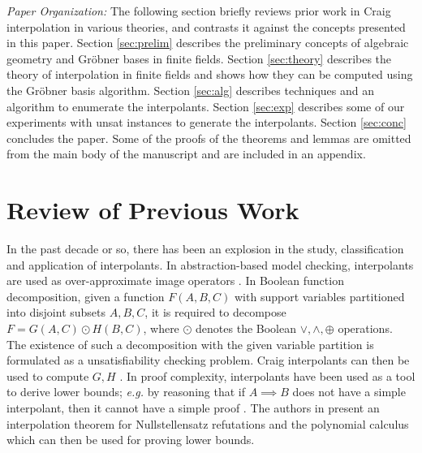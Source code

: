 {\it Paper Organization:} The following section briefly reviews prior
work in Craig interpolation in various theories, and contrasts it
against the concepts presented in this paper. Section \ref{sec:prelim} 
describes the preliminary concepts of algebraic geometry and Gr\"obner
bases in finite fields. Section \ref{sec:theory} describes the theory
of interpolation in finite fields and shows how they can be computed
using the Gr\"obner basis algorithm. Section \ref{sec:alg} describes
techniques and an algorithm to enumerate the interpolants. 
Section \ref{sec:exp} describes some of our experiments with unsat
instances to generate the interpolants. Section
\ref{sec:conc} concludes the paper.  Some of the proofs of the
theorems and lemmas are omitted from the main body of the manuscript
and are included in an appendix. 


\vspace{-0.1in}
\section{Review of Previous Work}
In the past decade or so, there has been an explosion in the study,
classification and application of interpolants. In abstraction-based
model checking, interpolants are used as over-approximate image
operators \cite{McMillan:CAV03}. In Boolean function decomposition,
given a function $F(A, B, C)$ with support variables partitioned into
disjoint subsets $A, B, C$, it is required to decompose $F = G(A, C)
\odot H(B,C)$, where $\odot$ denotes the Boolean $\vee, \wedge,
\oplus$ operations. The existence of such a 
decomposition with the given variable partition is formulated as a
unsatisfiability checking problem. Craig interpolants can then be used
to compute $G, H$ \cite{roland:bidecomp}
\cite{roland:ashenhurst}. 
In proof complexity, interpolants have been used as a tool to derive 
lower bounds; {\it e.g.} by reasoning that if $A\implies B$ does not
have a simple interpolant, then it cannot have a simple proof
\cite{pudlak:ci}. The authors in \cite{PudlakPCFA1998} present
an interpolation theorem for Nullstellensatz refutations and the
polynomial calculus \cite{CEI:stoc-96} which can then be used for
proving lower bounds. 

